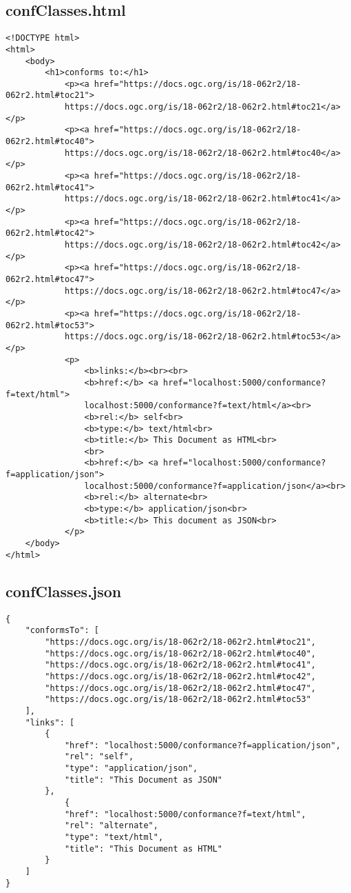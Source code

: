 \subsection{confClasses.html}
\begin{lstlisting}[caption={confClasses.html}, style = HTML]
<!DOCTYPE html>
<html>
    <body>
        <h1>conforms to:</h1>
            <p><a href="https://docs.ogc.org/is/18-062r2/18-062r2.html#toc21">
            https://docs.ogc.org/is/18-062r2/18-062r2.html#toc21</a></p>
            <p><a href="https://docs.ogc.org/is/18-062r2/18-062r2.html#toc40">
            https://docs.ogc.org/is/18-062r2/18-062r2.html#toc40</a></p>
            <p><a href="https://docs.ogc.org/is/18-062r2/18-062r2.html#toc41">
            https://docs.ogc.org/is/18-062r2/18-062r2.html#toc41</a></p>
            <p><a href="https://docs.ogc.org/is/18-062r2/18-062r2.html#toc42">
            https://docs.ogc.org/is/18-062r2/18-062r2.html#toc42</a></p>
			<p><a href="https://docs.ogc.org/is/18-062r2/18-062r2.html#toc47">
            https://docs.ogc.org/is/18-062r2/18-062r2.html#toc47</a></p>
			<p><a href="https://docs.ogc.org/is/18-062r2/18-062r2.html#toc53">
            https://docs.ogc.org/is/18-062r2/18-062r2.html#toc53</a></p>
            <p>
                <b>links:</b><br><br>
                <b>href:</b> <a href="localhost:5000/conformance?f=text/html">
                localhost:5000/conformance?f=text/html</a><br>
                <b>rel:</b> self<br>
                <b>type:</b> text/html<br>
                <b>title:</b> This Document as HTML<br>
                <br>
                <b>href:</b> <a href="localhost:5000/conformance?f=application/json">
                localhost:5000/conformance?f=application/json</a><br>
                <b>rel:</b> alternate<br>
                <b>type:</b> application/json<br>
                <b>title:</b> This document as JSON<br>
            </p>
    </body>
</html>
\end{lstlisting}\label{RessourceConfClassesHTML}  

\subsection{confClasses.json}
\begin{lstlisting}[caption={confClasses.json}, style = JSON]
{
    "conformsTo": [
        "https://docs.ogc.org/is/18-062r2/18-062r2.html#toc21",
        "https://docs.ogc.org/is/18-062r2/18-062r2.html#toc40",
        "https://docs.ogc.org/is/18-062r2/18-062r2.html#toc41",
        "https://docs.ogc.org/is/18-062r2/18-062r2.html#toc42",
        "https://docs.ogc.org/is/18-062r2/18-062r2.html#toc47",
        "https://docs.ogc.org/is/18-062r2/18-062r2.html#toc53"
    ],
    "links": [
        {
            "href": "localhost:5000/conformance?f=application/json",
            "rel": "self",
            "type": "application/json",
            "title": "This Document as JSON"
        },
            {
            "href": "localhost:5000/conformance?f=text/html",
            "rel": "alternate",
            "type": "text/html",
            "title": "This Document as HTML"
        }
    ]
}
\end{lstlisting}\label{RessourceConfClassesJSON}  

